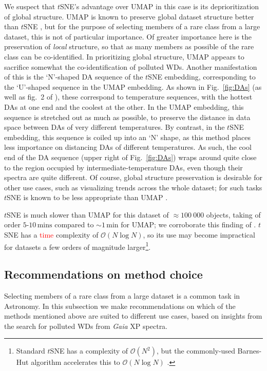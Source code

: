\documentclass[fleqn,usenatbib]{rasti}
\newcommand{\red}[1]{\textcolor{red}{#1}}
\begin{document}
We suspect that $t$SNE's advantage over UMAP in this case is its deprioritization of global structure.
UMAP is known to preserve global dataset structure better than $t$SNE \citep{mcinnes18, fotopoulou24}, but for the purpose of selecting members of a rare class from a large dataset, this is not of particular importance.
Of greater importance here is the preservation of \textit{local} structure, so that as many members as possible of the rare class can be co-identified.
In prioritizing global structure, UMAP appears to sacrifice somewhat the co-identification of polluted WDs.
Another manifestation of this is the `N'-shaped DA sequence of the $t$SNE embedding, corresponding to the `U'-shaped sequence in the UMAP embedding.
As shown in Fig.~\ref{fig:DAs} (as well as fig.~2 of \citealt{kao24}), these correspond to temperature sequences, with the hottest DAs at one end and the coolest at the other.
In the UMAP embedding, this sequence is stretched out as much as possible, to preserve the distance in data space between DAs of very different temperatures.
By contrast, in the $t$SNE embedding, this sequence is coiled up into an `N' shape, as this method places less importance on distancing DAs of different temperatures.
As such, the cool end of the DA sequence (upper right of Fig.~\ref{fig:DAs}) wraps around quite close to the region occupied by intermediate-temperature DAs, even though their spectra are quite different.
Of course, global structure preservation is desirable for other use cases, such as visualizing trends across the whole dataset; for such tasks $t$SNE is known to be less appropriate than UMAP \citep{mcinnes18}.

$t$SNE is much slower than UMAP for this dataset of $\approx 100~000$ objects, taking of order $5\text{-}10\,\text{mins}$ compared to $\sim1\,\text{min}$ for UMAP; we corroborate this finding of \citet{kao24}.
$t$SNE has a \red{time} complexity of $\mathcal{O}(N \log N)$, so its use may become impractical for datasets a few orders of magnitude larger\footnote{
    Standard $t$SNE has a complexity of $\mathcal{O}(N^2)$, but the commonly-used Barnes-Hut algorithm \citep{barnes86} accelerates this to $\mathcal{O}(N\log N)$ \citep{vandermaaten13}.
}.


\subsection{Recommendations on method choice}

Selecting members of a rare class from a large dataset is a common task in Astronomy.
In this subsection we make recommendations on which of the methods mentioned above are suited to different use cases, based on insights from the search for polluted WDs from \textit{Gaia} XP spectra.
\end{document}
